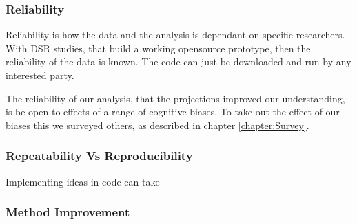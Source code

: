 \subsubsection{Reliability}
Reliability is how the data and the analysis is dependant on specific researchers.
With DSR studies, that build a working opensource prototype, then the reliability of the data is known.
The code can just be downloaded and run by any interested party.  

The reliability of our analysis, that the projections improved our understanding, is be open to effects of a range of cognitive biases.
To take out the effect of our biases this we surveyed others, as described in chapter \ref{chapter:Survey}.

\subsubsection{Repeatability Vs Reproducibility}
Implementing ideas in code can take

\subsubsection{Method Improvement}